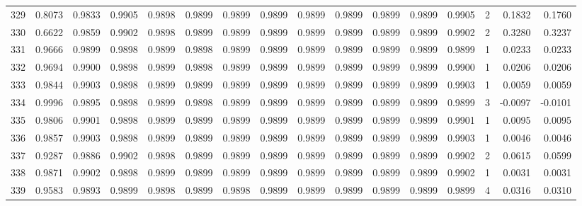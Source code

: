 \begin{tabular}{lrrrrrrrrrrrrrrr}
329 &      0.8073 &  0.9833 &  0.9905 &  0.9898 &  0.9899 &  0.9899 &  0.9899 &  0.9899 &  0.9899 &  0.9899 &   0.9899 &     0.9905 &      2 &                    0.1832 &                     0.1760 \\
330 &      0.6622 &  0.9859 &  0.9902 &  0.9898 &  0.9899 &  0.9899 &  0.9899 &  0.9899 &  0.9899 &  0.9899 &   0.9899 &     0.9902 &      2 &                    0.3280 &                     0.3237 \\
331 &      0.9666 &  0.9899 &  0.9898 &  0.9899 &  0.9898 &  0.9899 &  0.9899 &  0.9899 &  0.9899 &  0.9899 &   0.9899 &     0.9899 &      1 &                    0.0233 &                     0.0233 \\
332 &      0.9694 &  0.9900 &  0.9898 &  0.9899 &  0.9898 &  0.9899 &  0.9899 &  0.9899 &  0.9899 &  0.9899 &   0.9899 &     0.9900 &      1 &                    0.0206 &                     0.0206 \\
333 &      0.9844 &  0.9903 &  0.9898 &  0.9899 &  0.9899 &  0.9899 &  0.9899 &  0.9899 &  0.9899 &  0.9899 &   0.9899 &     0.9903 &      1 &                    0.0059 &                     0.0059 \\
334 &      0.9996 &  0.9895 &  0.9898 &  0.9899 &  0.9898 &  0.9899 &  0.9899 &  0.9899 &  0.9899 &  0.9899 &   0.9899 &     0.9899 &      3 &                   -0.0097 &                    -0.0101 \\
335 &      0.9806 &  0.9901 &  0.9898 &  0.9899 &  0.9899 &  0.9899 &  0.9899 &  0.9899 &  0.9899 &  0.9899 &   0.9899 &     0.9901 &      1 &                    0.0095 &                     0.0095 \\
336 &      0.9857 &  0.9903 &  0.9898 &  0.9899 &  0.9899 &  0.9899 &  0.9899 &  0.9899 &  0.9899 &  0.9899 &   0.9899 &     0.9903 &      1 &                    0.0046 &                     0.0046 \\
337 &      0.9287 &  0.9886 &  0.9902 &  0.9898 &  0.9899 &  0.9899 &  0.9899 &  0.9899 &  0.9899 &  0.9899 &   0.9899 &     0.9902 &      2 &                    0.0615 &                     0.0599 \\
338 &      0.9871 &  0.9902 &  0.9898 &  0.9899 &  0.9899 &  0.9899 &  0.9899 &  0.9899 &  0.9899 &  0.9899 &   0.9899 &     0.9902 &      1 &                    0.0031 &                     0.0031 \\
339 &      0.9583 &  0.9893 &  0.9899 &  0.9898 &  0.9899 &  0.9898 &  0.9899 &  0.9899 &  0.9899 &  0.9899 &   0.9899 &     0.9899 &      4 &                    0.0316 &                     0.0310 \\

\end{tabular}
